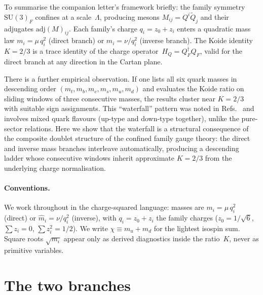 \documentclass[preprint,12pt]{elsarticle}
\newcommand{\SU}{\mathrm{SU}}
\newcommand{\adj}{\mathrm{adj}}
\begin{document}
To summarise the companion letter's framework briefly:
the family symmetry $\SU(3)_F$ confines at a scale~$\Lambda$,
producing mesons $M_{ij} = Q^i\tilde{Q}_j$ and their adjugates
$\adj(M)_{ij}$.  Each family's charge $q_i = z_0 + z_i$
enters a quadratic mass law $m_i = \mu\,q_i^2$ (direct branch)
or $\hat{m}_i = \nu/q_i^2$ (inverse branch).
The Koide identity $K = 2/3$ is a trace identity
of the charge operator~$H_Q = Q_F^\dagger Q_F$, valid for
the direct branch at any direction in the Cartan plane.

There is a further empirical observation.
If one lists all six quark masses in descending order
$(m_t, m_b, m_c, m_s, m_u, m_d)$ and evaluates the Koide ratio
on sliding windows of three consecutive masses, the results cluster
near $K = 2/3$ with suitable sign assignments.
This ``waterfall'' pattern was noted in
Refs.~\cite{Rivero:2005,Zenczykowski:2012}
and involves mixed quark flavours (up-type and down-type together),
unlike the pure-sector relations.
Here we show that the waterfall is a structural consequence
of the composite doublet structure of the confined family
gauge theory:
the direct and inverse mass branches interleave automatically,
producing a descending ladder whose consecutive windows
inherit approximate $K = 2/3$ from the underlying charge
normalisation.

\paragraph{Conventions.}
We work throughout in the charge-squared language:
masses are $m_i = \mu\,q_i^2$ (direct) or $\hat{m}_i = \nu/q_i^2$
(inverse), with $q_i = z_0 + z_i$ the family charges
($z_0 = 1/\sqrt{6}$, $\sum z_i = 0$, $\sum z_i^2 = 1/2$).
We write $\chi \equiv m_u + m_d$ for the lightest isospin sum.
Square roots $\sqrt{m_i}$ appear only as derived diagnostics
inside the ratio~$K$, never as primitive variables.

\section{The two branches}
\label{sec:branches}
\end{document}
